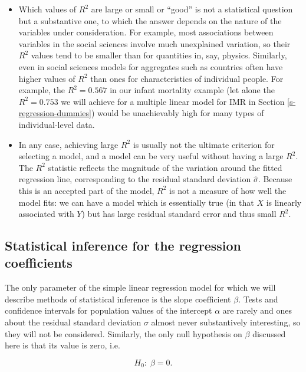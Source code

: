\documentclass[11pt,a4paper,openany]{book}
\begin{document}
\begin{itemize}
\item
  Which values of \(R^{2}\) are large or small or ``good'' is not a
  statistical question but a substantive one, to which the answer
  depends on the nature of the variables under consideration. For
  example, most associations between variables in the social sciences
  involve much unexplained variation, so their \(R^{2}\) values tend to
  be smaller than for quantities in, say, physics. Similarly, even in
  social sciences models for aggregates such as countries often have
  higher values of \(R^{2}\) than ones for characteristics of individual
  people. For example, the \(R^{2}=0.567\) in our infant mortality
  example (let alone the \(R^{2}=0.753\) we will achieve for a multiple
  linear model for IMR in Section \ref{s-regression-dummies}) would be
  unachievably high for many types of individual-level data.
\item
  In any case, achieving large \(R^{2}\) is usually not the ultimate
  criterion for selecting a model, and a model can be very useful
  without having a large \(R^{2}\). The \(R^{2}\) statistic reflects the
  magnitude of the variation around the fitted regression line,
  corresponding to the residual standard deviation \(\hat{\sigma}\).
  Because this is an accepted part of the model, \(R^{2}\) is not a
  measure of how well the model fits: we can have a model which is
  essentially true (in that \(X\) is linearly associated with \(Y\)) but
  has large residual standard error and thus small \(R^{2}\).
\end{itemize}

\subsection{Statistical inference for the regression
coefficients}\label{ss-regression-simple-inf}

The only parameter of the simple linear regression model for which we
will describe methods of statistical inference is the slope coefficient
\(\beta\). Tests and confidence intervals for population values of the
intercept \(\alpha\) are rarely and ones about the residual standard
deviation \(\sigma\) almost never substantively interesting, so they
will not be considered. Similarly, the only null hypothesis on \(\beta\)
discussed here is that its value is zero, i.e.

\begin{equation}H_{0}:\; \beta=0.
\label{eq:H0betasimple}\end{equation}
\end{document}
